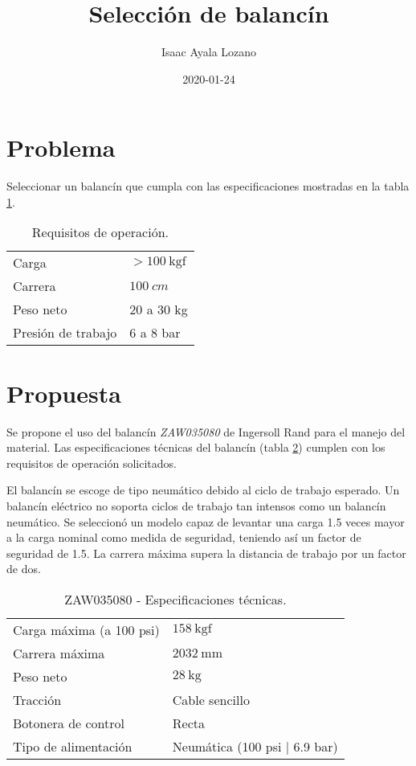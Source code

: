 \documentclass[a4paper,12pt]{article}
\title{Selección de balancín}
\author{Isaac Ayala Lozano}
\date{2020-01-24}
\begin{document}
\maketitle

\section{Problema}

Seleccionar un balancín que cumpla con las especificaciones mostradas en la tabla \ref{tab: specs}.

\begin{table}[htb!]
 \begin{center}
\begin{tabular}{ll}
\hline
Carga & $> 100 \ \text{kgf}$ \\
Carrera & $100 \ cm$ \\
Peso neto & 20 a 30 kg\\
Presión de trabajo & 6 a 8 bar\\
\hline
\end{tabular}
\end{center}
\caption{Requisitos de operación.}
\label{tab: specs}
\end{table}

\section{Propuesta}

Se propone el uso del balancín \emph{ZAW035080} de Ingersoll Rand \cite{ingersollRand} para el manejo del material. 
Las especificaciones técnicas del balancín (tabla \ref{tab: balancer specs}) cumplen con los requisitos de operación solicitados.

El balancín se escoge de tipo neumático debido al ciclo de trabajo esperado. 
Un balancín eléctrico no soporta ciclos de trabajo tan intensos como un balancín neumático.
Se seleccionó un modelo capaz de levantar una carga 1.5 veces mayor a la carga nominal como medida de seguridad, teniendo así un factor de seguridad de 1.5.
La carrera máxima supera la distancia de trabajo por un factor de dos.


\begin{table}[htb!]
 \begin{center}
\begin{tabular}{ll}
\hline
Carga máxima (a 100 psi) & $158 \ \text{kgf}$ \\
Carrera máxima & $2032 \ \text{mm}$ \\
Peso neto & $28 \ \text{kg}$\\
Tracción & Cable sencillo\\
Botonera de control & Recta \\
Tipo de alimentación & Neumática (100 psi | 6.9 bar)\\
\hline
\end{tabular}
\end{center}
\caption{ZAW035080 - Especificaciones técnicas.}
\label{tab: balancer specs}
\end{table}


 \printbibliography
\end{document}
